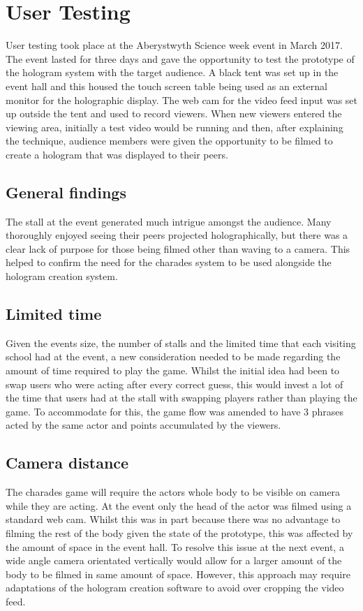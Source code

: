 \section{User Testing}
User testing took place at the Aberystwyth Science week event in March 2017. The event lasted for three days and gave the opportunity to test the prototype of the hologram system with the target audience. A black tent was set up in the event hall and this housed the touch screen table being used as an external monitor for the holographic display. The web cam for the video feed input was set up outside the tent and used to record viewers. When new viewers entered the viewing area, initially a test video would be running and then, after explaining the technique, audience members were given the opportunity to be filmed to create a hologram that was displayed to their peers.

\subsection{General findings}
The stall at the event generated much intrigue amongst the audience. Many thoroughly enjoyed seeing their peers projected holographically, but there was a clear lack of purpose for those being filmed other than waving to a camera. This helped to confirm the need for the charades system to be used alongside the hologram creation system.

\subsection{Limited time}
Given the events size, the number of stalls and the limited time that each visiting school had at the event, a new consideration needed to be made regarding the amount of time required to play the game. Whilst the initial idea had been to swap users who were acting after every correct guess, this would invest a lot of the time that users had at the stall with swapping players rather than playing the game. To accommodate for this, the game flow was amended to have 3 phrases acted by the same actor and points accumulated by the viewers.

\subsection{Camera distance}
The charades game will require the actors whole body to be visible on camera while they are acting. At the event only the head of the actor was filmed using a standard web cam. Whilst this was in part because there was no advantage to filming the rest of the body given the state of the prototype, this was affected by the amount of space in the event hall. To resolve this issue at the next event, a wide angle camera orientated vertically would allow for a larger amount of the body to be filmed in same amount of space. However, this approach may require adaptations of the hologram creation software to avoid over cropping the video feed.
